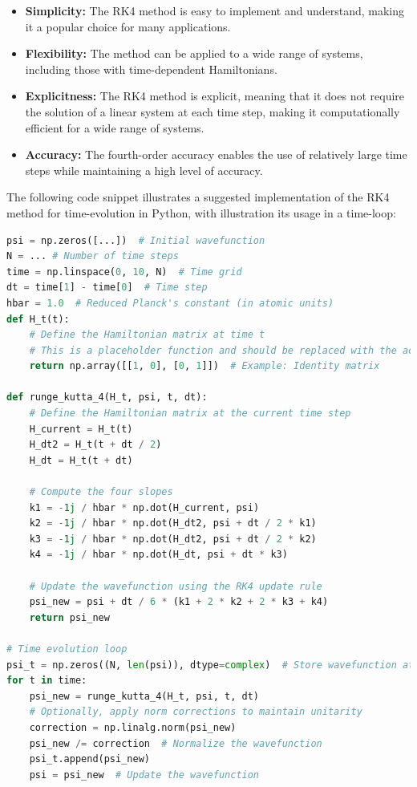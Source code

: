 \documentclass{subfiles}
\begin{document}
\begin{itemize}
    \item \textbf{Simplicity:} The RK4 method is easy to implement and understand, making it a popular choice for many applications.
    \item \textbf{Flexibility:} The method can be applied to a wide range of systems, including those with time-dependent Hamiltonians.
    \item \textbf{Explicitness:} The RK4 method is explicit, meaning that it does not require the solution of a linear system at each time step, making it computationally efficient for a wide range of systems.
    \item \textbf{Accuracy:} The fourth-order accuracy enables the use of relatively large time steps while maintaining a high level of accuracy.
\end{itemize}
The following code snippet illustrates a suggested implementation of the RK4 method for time-evolution in Python, with illustration its usage in a time-loop:
\begin{lstlisting}[language=Python]
psi = np.zeros([...])  # Initial wavefunction
N = ... # Number of time steps
time = np.linspace(0, 10, N)  # Time grid
dt = time[1] - time[0]  # Time step
hbar = 1.0  # Reduced Planck's constant (in atomic units)
def H_t(t):
    # Define the Hamiltonian matrix at time t
    # This is a placeholder function and should be replaced with the actual Hamiltonian
    return np.array([[1, 0], [0, 1]])  # Example: Identity matrix

def runge_kutta_4(H_t, psi, t, dt):
    # Define the Hamiltonian matrix at the current time step
    H_current = H_t(t)
    H_dt2 = H_t(t + dt / 2)
    H_dt = H_t(t + dt)
    
    # Compute the four slopes
    k1 = -1j / hbar * np.dot(H_current, psi)
    k2 = -1j / hbar * np.dot(H_dt2, psi + dt / 2 * k1)
    k3 = -1j / hbar * np.dot(H_dt2, psi + dt / 2 * k2)
    k4 = -1j / hbar * np.dot(H_dt, psi + dt * k3)

    # Update the wavefunction using the RK4 update rule
    psi_new = psi + dt / 6 * (k1 + 2 * k2 + 2 * k3 + k4)
    return psi_new

# Time evolution loop
psi_t = np.zeros((N, len(psi)), dtype=complex)  # Store wavefunction at each time step
for t in time:
    psi_new = runge_kutta_4(H_t, psi, t, dt)  
    # Optionally, apply norm corrections to maintain unitarity
    correction = np.linalg.norm(psi_new)
    psi_new /= correction  # Normalize the wavefunction
    psi_t.append(psi_new)
    psi = psi_new  # Update the wavefunction
\end{lstlisting}
\end{document}
